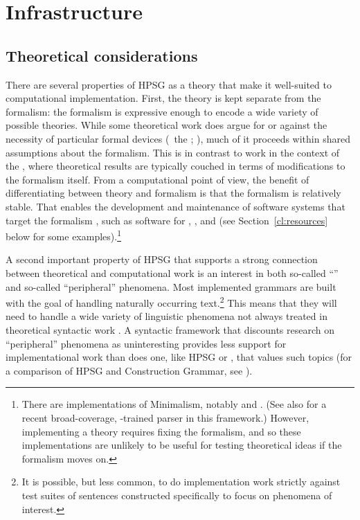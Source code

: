 \documentclass[output=paper
                ,modfonts
                ,nonflat
	        ,collection
	        ,collectionchapter
	        ,collectiontoclongg
 	        ,biblatex
                ,babelshorthands
                ,newtxmath
                ,draftmode
                ,colorlinks, citecolor=brown
]{./langsci/langscibook}
\begin{document}
\section{Infrastructure}
\label{cl:infrastructure}

\subsection{Theoretical considerations}
\label{cl:theoretical}

There are several properties of HPSG as a theory that make it well-suited to computational implementation.
First, the theory is kept separate from the formalism:
the formalism is expressive enough to encode a wide variety of possible theories.
While some theoretical work does argue for or against the necessity of particular formal devices
(\eg\ the ; \citealt{Reape94a}),
much of it proceeds within shared assumptions about the formalism.
This is in contrast to work in the context of the  \citep{Chomsky95a-u},
where theoretical results are typically couched in terms of modifications to the formalism itself.
From a computational point of view, the benefit of differentiating between theory and formalism
is that the formalism is relatively stable.
That enables the development and maintenance of software systems that target the formalism \citep{boguraev1988software},
such as software for , , and 
(see Section~\ref{cl:resources} below for some examples).\footnote{%
	There are implementations of Minimalism, notably \citet{Stabler97a-u} and \citet{Herring:16}. (See also \citealt{Tor:Sta:Ste:19} for a recent broad-coverage, -trained parser in this framework.)
	However, implementing a theory requires fixing the formalism,
	and so these implementations are unlikely to be useful for testing theoretical ideas
	if the formalism moves on.
}

A second important property of HPSG that supports a strong connection between theoretical and computational work is an interest in both so-called ``'' and so-called ``peripheral'' phenomena. Most implemented grammars are built with the goal of handling naturally occurring text.\footnote{It is possible, but less common, to do implementation work strictly against test suites of sentences constructed specifically to focus on phenomena of interest.} This means that they will need to handle a wide variety of linguistic phenomena not always treated in theoretical syntactic work \citep{Baldwin-et-al-05}. A syntactic framework that discounts research on ``peripheral'' phenomena as uninteresting provides less support for implementational work than does one, like HPSG or , that values such topics (for a comparison of HPSG and Construction Grammar, see ).
\end{document}
